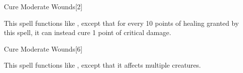 \begin{spellsection}{Cure Moderate Wounds}[2]
    \begin{spellheader}
    \end{spellheader}
    \begin{spellcontent}
        \begin{spelltargetinginfo}
        \end{spelltargetinginfo}
        \begin{spelleffects}
            \spellspecial This spell functions like , except that for every 10 points of healing granted by this spell, it can instead cure 1 point of critical damage.
        \end{spelleffects}
    \end{spellcontent}
    \begin{spellfooter}
        \miscastrandom
    \end{spellfooter}
\end{spellsection}

\begin{spellsection}[Mass]{Cure Moderate Wounds}[6]
    \begin{spellheader}
    \end{spellheader}
    \begin{spellcontent}
        \begin{spelltargetinginfo}
        \end{spelltargetinginfo}
        \begin{spelleffects}
            \spellspecial This spell functions like , except that it affects multiple creatures.
        \end{spelleffects}
    \end{spellcontent}
    \begin{spellfooter}
        \miscastexplode
    \end{spellfooter}
\end{spellsection}

